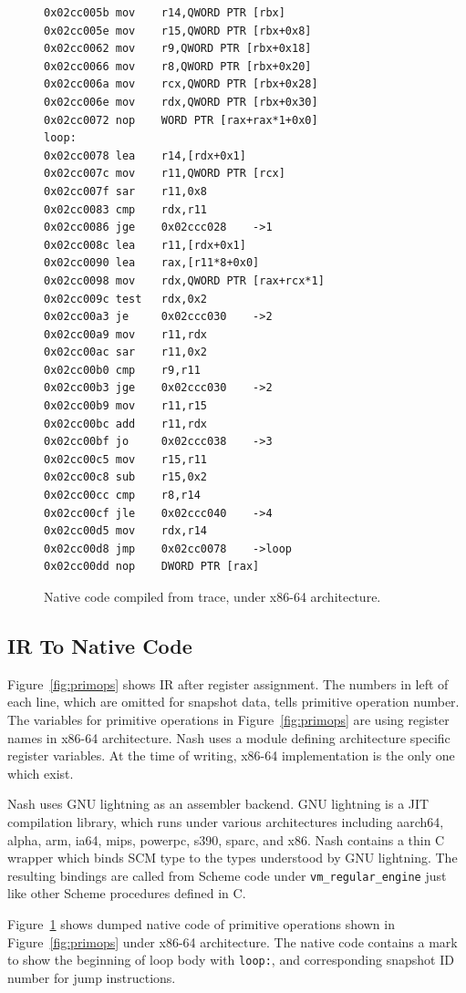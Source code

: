 \documentclass[preprint, 10pt]{sigplanconf}
\begin{document}
\begin{figure}
  \centering
  \small
\begin{verbatim}
0x02cc005b mov    r14,QWORD PTR [rbx]
0x02cc005e mov    r15,QWORD PTR [rbx+0x8]
0x02cc0062 mov    r9,QWORD PTR [rbx+0x18]
0x02cc0066 mov    r8,QWORD PTR [rbx+0x20]
0x02cc006a mov    rcx,QWORD PTR [rbx+0x28]
0x02cc006e mov    rdx,QWORD PTR [rbx+0x30]
0x02cc0072 nop    WORD PTR [rax+rax*1+0x0]
loop:
0x02cc0078 lea    r14,[rdx+0x1]
0x02cc007c mov    r11,QWORD PTR [rcx]
0x02cc007f sar    r11,0x8
0x02cc0083 cmp    rdx,r11
0x02cc0086 jge    0x02ccc028    ->1
0x02cc008c lea    r11,[rdx+0x1]
0x02cc0090 lea    rax,[r11*8+0x0]
0x02cc0098 mov    rdx,QWORD PTR [rax+rcx*1]
0x02cc009c test   rdx,0x2
0x02cc00a3 je     0x02ccc030    ->2
0x02cc00a9 mov    r11,rdx
0x02cc00ac sar    r11,0x2
0x02cc00b0 cmp    r9,r11
0x02cc00b3 jge    0x02ccc030    ->2
0x02cc00b9 mov    r11,r15
0x02cc00bc add    r11,rdx
0x02cc00bf jo     0x02ccc038    ->3
0x02cc00c5 mov    r15,r11
0x02cc00c8 sub    r15,0x2
0x02cc00cc cmp    r8,r14
0x02cc00cf jle    0x02ccc040    ->4
0x02cc00d5 mov    rdx,r14
0x02cc00d8 jmp    0x02cc0078    ->loop
0x02cc00dd nop    DWORD PTR [rax]
\end{verbatim}
\caption{Native code compiled from trace, under x86-64 architecture.}
\label{fig:ncode}
\end{figure}

\subsection{IR To Native Code}
Figure~\hyperref[fig:primops]{\ref{fig:primops}} shows IR after register
assignment. The numbers in left of each line, which are omitted for snapshot
data, tells primitive operation number. The variables for primitive operations
in Figure~\hyperref[fig:primops]{\ref{fig:primops}} are using register names in
x86-64 architecture. Nash uses a module defining architecture specific register
variables. At the time of writing, x86-64 implementation is the only one which
exist.

Nash uses GNU lightning as an assembler backend. GNU lightning is a JIT
compilation library, which runs under various architectures including aarch64,
alpha, arm, ia64, mips, powerpc, s390, sparc, and x86. Nash contains a thin C
wrapper which binds SCM type to the types understood by GNU lightning. The
resulting bindings are called from Scheme code under
\texttt{vm\_regular\_engine} just like other Scheme procedures defined in C.

Figure~\hyperref[fig:ncode]{\ref{fig:ncode}} shows dumped native code of
primitive operations shown in Figure~\hyperref[fig:primops]{\ref{fig:primops}}
under x86-64 architecture. The native code contains a mark to show the beginning
of loop body with \texttt{loop:}, and corresponding snapshot ID number for jump
instructions.
\end{document}

